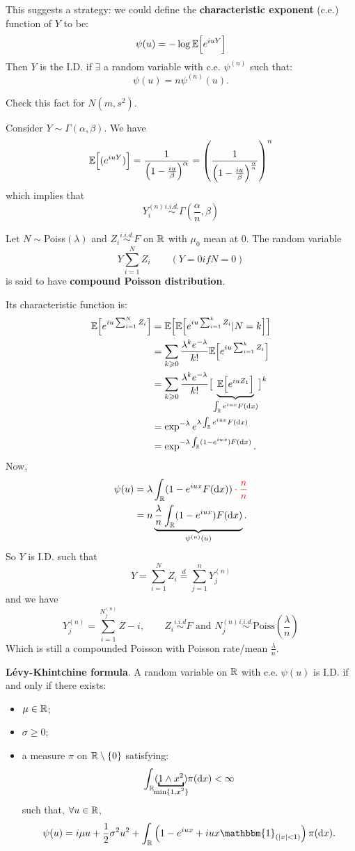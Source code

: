 \documentclass{article}
\begin{document}
	This suggests a strategy: we could define the \textbf{characteristic exponent} (c.e.) function of $Y$ to be:
	\[
	\psi(u)=-\log\mathbb{E}\Bigl[{e^{iuY}}\Bigr]
	\]
	Then $Y$ is the I.D. if $\exists$ a random variable with c.e. $\psi^{(n)}$ such that:
	\[\psi(u)=n\psi^{(n)}(u).\]
	\begin{exercise}
		Check this fact for $N(m,s^2)$.
	\end{exercise}
	\begin{example}
		Consider $Y\sim\Gamma(\alpha,\beta)$. We have
		\[
		\mathbb{E}\Bigl[{(e^{iuY})}\Bigr]=\frac{1}{\left(1-\frac{iu}{\beta}\right)^\alpha}=\left(\frac{1}{\left(1-\frac{iu}{\beta}\right)^\frac{\alpha}{n}}\right)^n
		\]
		which implies that 
		\[
		Y_i^{(n)}\stackrel{i.i.d.}{\sim}\Gamma(\frac{\alpha}{n},\beta)
		\]
	\end{example}
	\begin{definition}
		Let $N\sim$Poiss$(\lambda)$ and $Z_i\stackrel{i.i.d.}{\sim}F$ on $\mathbb{R}$ with $\mu_0$ mean at 0. The random variable
		\[Y\sum_{i=1}^{N}Z_i\qquad(Y=0 if N=0)\]
		is said to have \textbf{compound Poisson distribution}.
	\end{definition}
	Its characteristic function is:
	\begin{align*}
		\mathbb{E}\Bigl[{e^{iu\sum_{i=1}^{N}Z_i}}\Bigr]&=\mathbb{E}\Bigl[{\mathbb{E}\Bigl[{e^{iu\sum_{i=1}^{k}Z_i}|N=k}\Bigr]}\Bigr]\\
		&=\sum_{k\geqslant0}\frac{\lambda^ke^{-\lambda}}{k!}\mathbb{E}\Bigl[{e^{iu\sum_{i=1}^{k}Z_i}}\Bigr]\\
		&=\sum_{k\geqslant0}\frac{\lambda^ke^{-\lambda}}{k!}\bigl[\underbrace{\mathbb{E}\Bigl[{e^{iuZ_1}}\Bigr]}_{\int_{\mathbb{R}} e^{iux}F(\mathop{}\!\mathrm{d} x)}\bigr]^k\\
		&=\exp^{-\lambda}e^{\lambda\int_{\mathbb{R}} e^{iux}F(\mathop{}\!\mathrm{d} x)}\\
		&=\exp^{-\lambda\int_{\mathbb{R}}(1-e^{iux})F(\mathop{}\!\mathrm{d} x)}.
	\end{align*}
	Now,
	\begin{align*}
		\psi(u)&=\lambda\int_\R(1-e^{iux}F(\dif x))\begingroup\color{red}\cdot\frac{n}{n}\endgroup\\
		&=n\underbrace{\frac{\lambda}{n}\int_\R(1-e^{iux})F(\dif x)}_{\psi^{(n)}(u)}.
	\end{align*}
	So $Y$ is I.D. such that \[Y=\sum_{i=1}^{N}Z_i\stackrel{d}{=}\sum_{j=1}^{n}Y_j^{(n)}\]
	and we have
	\[
	Y_j^{(n)}=\sum_{i=1}^{N_j^{(n)}}Z-i,\qquad Z_i\stackrel{i.i.d}{\sim}F\text{ and }N_j^{(n)}\stackrel{i.i.d.}{\sim}\text{Poiss}\left(\frac{\lambda}{n}\right)
	\]
	Which is still a compounded Poisson with Poisson rate/mean $\frac{\lambda}{n}$.
	\begin{theorem}
		\textbf{L\'evy-Khintchine formula}. A random variable on $\mathbb{R}$ with c.e. $\psi(u)$ is I.D. if and only if there exists:
		\begin{itemize}
			\item $\mu \in \mathbb{R}$;
			\item $\sigma\geqslant 0$;
			\item a measure $\pi$ on $\mathbb{R}\setminus\{0\}$ satisfying:
			\[\int_\R(\underbracket{1\wedge x^2}_{\mathclap{\min\{1,x^2\}}})\pi(\dif x)<\infty\]
			such that, $\forall u\in\mathbb{R}$,
			\[\psi(u)=i\mu u +\frac{1}{2}\sigma^2 u^2+\int_\R\left(1-e^{iux}+iux\mathbbm{1}_{(|x|<1)}\right)\pi(\dif x).\]
		\end{itemize}
	\end{theorem}
\end{document}
